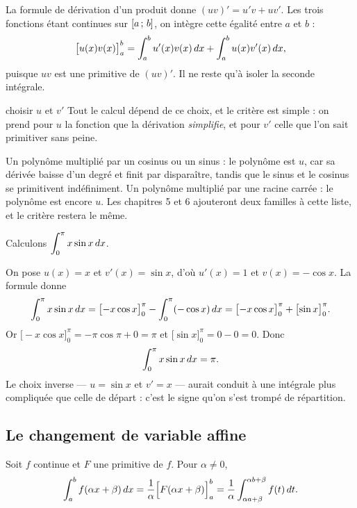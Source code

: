 \begin{demonstration}
La formule de dérivation d'un produit donne $(uv)' = u'v + uv'$. Les trois
fonctions étant continues sur $\left[a\,;\,b\right]$, on intègre cette égalité
entre $a$ et $b$ :
\[
  \bigl[u(x)v(x)\bigr]_{a}^{b} = \int_{a}^{b} u'(x)v(x)\,dx + \int_{a}^{b} u(x)v'(x)\,dx,
\]
puisque $uv$ est une primitive de $(uv)'$. Il ne reste qu'à isoler la seconde
intégrale.
\end{demonstration}

\begin{methode}{choisir $u$ et $v'$}
Tout le calcul dépend de ce choix, et le critère est simple : on prend pour
$u$ la fonction que la dérivation \emph{simplifie}, et pour $v'$ celle que
l'on sait primitiver sans peine.

Un polynôme multiplié par un cosinus ou un sinus : le polynôme est $u$, car sa
dérivée baisse d'un degré et finit par disparaître, tandis que le sinus et le
cosinus se primitivent indéfiniment. Un polynôme multiplié par une racine
carrée : le polynôme est encore $u$. Les chapitres 5 et 6 ajouteront deux
familles à cette liste, et le critère restera le même.
\end{methode}

\begin{exemple}
Calculons $\displaystyle\int_{0}^{\pi} x\sin x \,dx$.

On pose $u(x) = x$ et $v'(x) = \sin x$, d'où $u'(x) = 1$ et
$v(x) = -\cos x$. La formule donne
\[
  \int_{0}^{\pi} x\sin x \,dx
  = \bigl[-x\cos x\bigr]_{0}^{\pi} - \int_{0}^{\pi} (-\cos x)\,dx
  = \bigl[-x\cos x\bigr]_{0}^{\pi} + \bigl[\sin x\bigr]_{0}^{\pi} .
\]
Or $\bigl[-x\cos x\bigr]_{0}^{\pi} = -\pi\cos\pi + 0 = \pi$ et
$\bigl[\sin x\bigr]_{0}^{\pi} = 0-0 = 0$. Donc
\[
  \int_{0}^{\pi} x\sin x \,dx = \pi .
\]
Le choix inverse — $u = \sin x$ et $v' = x$ — aurait conduit à une intégrale
plus compliquée que celle de départ : c'est le signe qu'on s'est trompé de
répartition.
\end{exemple}

\subsection{Le changement de variable affine}

\begin{propriete}
Soit $f$ continue et $F$ une primitive de $f$. Pour $\alpha \neq 0$,
\[
  \int_{a}^{b} f(\alpha x + \beta)\,dx
  = \frac{1}{\alpha}\Bigl[F(\alpha x + \beta)\Bigr]_{a}^{b}
  = \frac{1}{\alpha}\int_{\alpha a + \beta}^{\alpha b + \beta} f(t)\,dt .
\]
\end{propriete}

